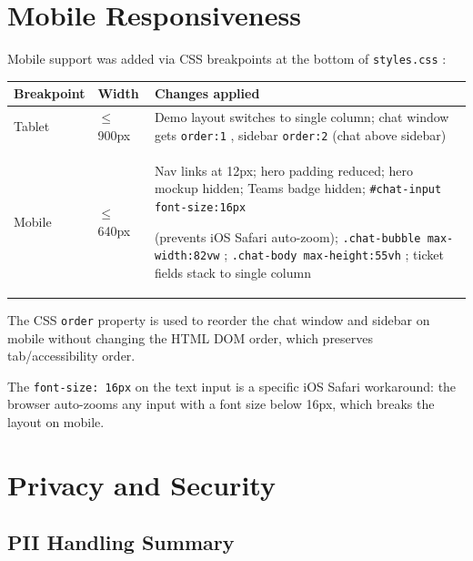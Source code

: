 \documentclass[12pt, a4paper]{article}
\newcommand{\inlinecode}[1]{%
  \colorbox{inlinecode!20}{\texttt{\small #1}}%
}
\begin{document}
\section{Mobile Responsiveness}

Mobile support was added via CSS breakpoints at the bottom of \inlinecode{styles.css}:

\begin{center}
\begin{tabular}{llp{7cm}}
\toprule
\textbf{Breakpoint} & \textbf{Width} & \textbf{Changes applied} \\
\midrule
Tablet & $\leq$900px & Demo layout switches to single column; chat window
  gets \inlinecode{order:1}, sidebar \inlinecode{order:2} (chat above sidebar) \\
Mobile & $\leq$640px & Nav links at 12px; hero padding reduced; hero mockup
  hidden; Teams badge hidden; \inlinecode{\#chat-input font-size:16px}
  (prevents iOS Safari auto-zoom); \inlinecode{.chat-bubble max-width:82vw};
  \inlinecode{.chat-body max-height:55vh}; ticket fields stack to single column \\
\bottomrule
\end{tabular}
\end{center}

The CSS \inlinecode{order} property is used to reorder the chat window and sidebar on
mobile without changing the HTML DOM order, which preserves tab/accessibility order.

The \inlinecode{font-size: 16px} on the text input is a specific iOS Safari workaround:
the browser auto-zooms any input with a font size below 16px, which breaks the layout
on mobile.

\section{Privacy and Security}

\subsection{PII Handling Summary}
\end{document}
